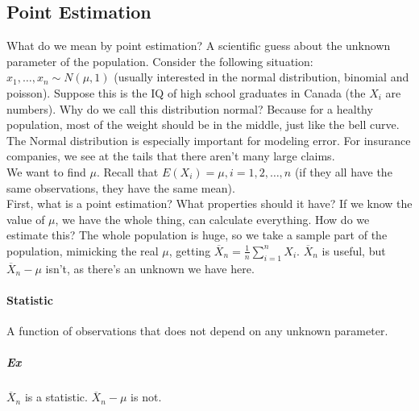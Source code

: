 \documentclass[12 pt]{article}
\begin{document}
        \subsection{Point Estimation} What do we mean by point
        estimation? A scientific guess about the unknown parameter of
        the population. Consider the following situation:
        \\ $x_1, \ldots, x_n \sim N(\mu, 1)$ (usually interested in
        the normal distribution, binomial and poisson). Suppose this
        is the IQ of high school graduates in Canada (the $X_i$ are
        numbers). Why do we call this distribution normal? Because for
        a healthy population, most of the weight should be in the
        middle, just like the bell curve. The Normal distribution is
        especially important for modeling error. For insurance
        companies, we see at the tails that there aren't many large
        claims.
        \\ We want to find $\mu$. Recall that $E(X_i)=\mu,
        i=1,2,\ldots,n$ (if they all have the same observations, they
        have the same mean).
        \\ First, what is a point estimation? What properties should
        it have? If we know the value of $\mu$, we have the whole
        thing, can calculate everything. How do we estimate this? The
        whole population is huge, so we take a sample part of the
        population, mimicking the real $\mu$, getting $\overline{X}_n
        = \frac{1}{n}\sum_{i=1}^nX_i$. $\overline{X}_n$ is useful, but
        $\overline{X}_n-\mu$ isn't, as there's an unknown we have
        here.
        \paragraph{Statistic} A function of observations that does not
        depend on any unknown parameter.
        \subparagraph{Ex} $\overline{X}_n$ is a
        statistic. $\overline{X}_n - \mu$ is not.
\end{document}
